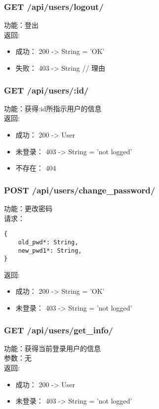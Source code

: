 \subsubsection{GET /api/users/logout/}

\noindent
功能：登出\\
返回:
\begin{itemize}
	\item 成功： 200 -> String = 'OK'
	\item 失败： 403 -> String // 理由
\end{itemize}


\subsubsection{GET /api/users/:id/}

\noindent
功能：获得:id所指示用户的信息\\
返回:
\begin{itemize}
	\item 成功： 200 -> User
	\item 未登录： 403 -> String = 'not logged'
	\item 不存在： 404
\end{itemize}

\subsubsection{POST /api/users/change\_password/}

\noindent
功能：更改密码\\
请求：
\begin{lstlisting}[numbers=none, frame=none]
{
    old_pwd*: String,
    new_pwd1*: String,
}
\end{lstlisting}
返回:
\begin{itemize}
	\item 成功： 200 -> String = 'OK'
	\item 未登录： 403 -> String = 'not logged'
\end{itemize}


\subsubsection{GET /api/users/get\_info/}

\noindent
功能：获得当前登录用户的信息\\
参数：无\\
返回:
\begin{itemize}
	\item 成功： 200 -> User
	\item 未登录： 403 -> String = 'not logged'
\end{itemize}


